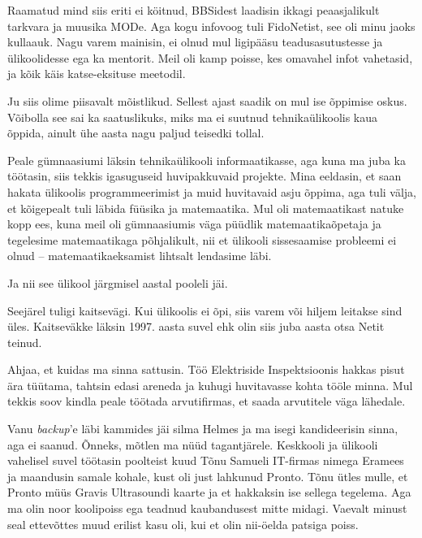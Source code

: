 
Raamatud mind siis eriti ei köitnud, BBSidest laadisin ikkagi 
peaasjalikult tarkvara ja muusika MODe. Aga kogu infovoog 
tuli FidoNetist, see oli minu jaoks kullaauk. Nagu varem 
mainisin, ei olnud mul ligipääsu teadusasutustesse ja
ülikoolidesse ega ka mentorit. Meil oli kamp 
poisse, kes omavahel infot vahetasid, ja kõik käis katse-eksituse meetodil.


Ju siis olime piisavalt mõistlikud. Sellest ajast saadik on mul 
ise õppimise oskus. Võibolla see sai ka saatuslikuks, miks ma ei suutnud
tehnikaülikoolis kaua õppida, ainult ühe aasta nagu
paljud teisedki tollal.

Peale gümnaasiumi läksin tehnikaülikooli informaatikasse, aga kuna ma juba ka töötasin, siis tekkis
igasuguseid huvipakkuvaid projekte. Mina eeldasin, et 
saan hakata ülikoolis programmeerimist ja muid huvitavaid asju 
õppima, aga tuli välja, et kõigepealt tuli läbida füüsika ja 
matemaatika. Mul oli matemaatikast natuke kopp ees, kuna 
meil oli gümnaasiumis väga püüdlik matemaatikaõpetaja ja tegelesime 
matemaatikaga põhjalikult, nii et ülikooli sissesaamise probleemi 
ei olnud -- matemaatikaeksamist lihtsalt 
lendasime läbi.

Ja nii see ülikool järgmisel aastal pooleli jäi.


Seejärel tuligi kaitsevägi. Kui ülikoolis ei õpi, siis varem või 
hiljem leitakse sind üles. Kaitseväkke läksin 1997. aasta suvel ehk 
olin siis juba aasta otsa Netit teinud. 

Ahjaa, et kuidas ma sinna sattusin. Töö Elektriside Inspektsioonis hakkas pisut ära tüütama, tahtsin 
edasi areneda ja kuhugi huvitavasse kohta tööle 
minna. Mul tekkis soov kindla peale töötada arvutifirmas, et saada arvutitele väga 
lähedale.

Vanu \emph{backup}'e läbi kammides jäi silma Helmes ja ma isegi kandideerisin sinna, aga ei saanud. Õnneks, mõtlen ma nüüd tagantjärele. Keskkooli ja ülikooli vahelisel suvel töötasin poolteist kuud 
Tõnu Samueli IT-firmas nimega Eramees 
ja maandusin samale kohale, kust oli just lahkunud Pronto. 
Tõnu ütles mulle, et Pronto müüs Gravis 
Ultrasoundi kaarte ja et hakkaksin ise sellega tegelema. Aga ma olin 
noor koolipoiss ega teadnud kaubandusest mitte midagi. Vaevalt
minust seal ettevõttes muud erilist kasu oli, kui et olin nii-öelda patsiga poiss. 

